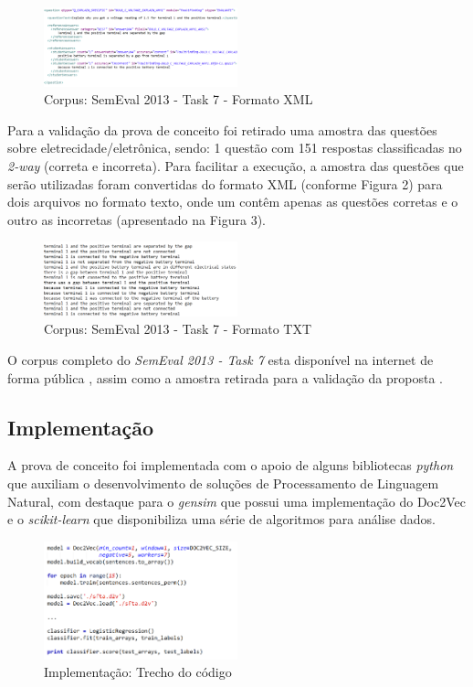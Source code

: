 \documentclass[conference]{IEEEtran}
\begin{document}
\begin{figure}[h]
\centering
\includegraphics[width=0.5\textwidth]{corpus}
\caption{Corpus: SemEval 2013 - Task 7 - Formato XML}
\end{figure}

Para a validação da prova de conceito foi retirado uma amostra das questões sobre eletrecidade/eletrônica, sendo: 1 questão com 151 respostas classificadas no \textit{2-way} (correta e incorreta). Para facilitar a execução, a amostra das questões que serão utilizadas foram convertidas do formato XML (conforme Figura 2) para dois arquivos no formato texto, onde um contêm apenas as questões corretas e o outro as incorretas (apresentado na Figura 3).

\begin{figure}[h]
\centering
\includegraphics[width=0.5\textwidth]{corpus_txt}
\caption{Corpus: SemEval 2013 - Task 7 - Formato TXT}
\end{figure}

O corpus completo do \textit{SemEval 2013 - Task 7} esta disponível na internet de forma pública \cite{DzikovskaCorpus:2013}, assim como a amostra retirada para a validação da proposta \cite{Comelli:2016}.

\subsection{Implementação}
A prova de conceito foi implementada com o apoio de alguns bibliotecas \textit{python} que auxiliam o desenvolvimento de soluções de Processamento de Linguagem Natural, com destaque para o \textit{gensim} \cite{gensim:2016} que possui uma implementação do Doc2Vec e o \textit{scikit-learn} \cite{sklearn:2016} que disponibiliza uma série de algoritmos para análise dados.

\begin{figure}[h]
\centering
\includegraphics[width=0.5\textwidth]{code}
\caption{Implementação: Trecho do código}
\end{figure}
\end{document}
